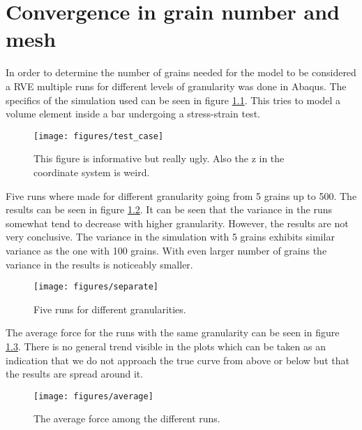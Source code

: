 \documentclass[convergence.tex]{subfiles}
\begin{document}
\chapter{Convergence in grain number and mesh}

In order to determine the number of grains needed for the model to be considered a RVE multiple runs for different levels of granularity was done in Abaqus. The specifics of the simulation used can be seen in figure \ref{fig:test_case}. This tries to model a volume element inside a bar undergoing a stress-strain test. 

\begin{figure}[ht]
\centering
\texttt{[image: figures/test\_case]}
\caption{This figure is informative but really ugly. Also the z in the coordinate system is weird.}
\label{fig:test_case}
\end{figure}


Five runs where made for different granularity going from 5 grains up to 500. The results can be seen in figure \ref{fig:separate}. It can be seen that the variance in the runs somewhat tend to decrease with higher granularity. However, the results are not very conclusive. The variance in the simulation with 5 grains exhibits similar variance as the one with 100 grains. With even larger number of grains the variance in the results is noticeably smaller. 

\begin{figure}[ht]
\centering
\texttt{[image: figures/separate]}
\caption{Five runs for different granularities.}
\label{fig:separate}
\end{figure}


The average force for the runs with the same granularity can be seen in figure \ref{fig:average}. There is no general trend visible in the plots which can be taken as an indication that we do not approach the true curve from above or below but that the results are spread around it.


\begin{figure}[ht]
\centering
\texttt{[image: figures/average]}
\caption{The average force among the different runs.}
\label{fig:average}
\end{figure}
\end{document}
